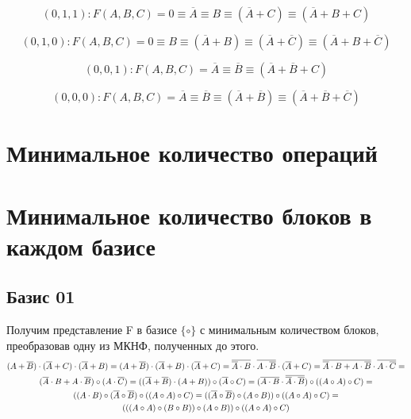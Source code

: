 \documentclass[a4paper,10pt]{article} %
\begin{document}
	\begin{equation}
	(0, 1, 1): F(A, B, C) = 0 \equiv \overline{A} \equiv B \equiv 
	(\overline{A} + C) \equiv (\overline{A} + B + C)
	\end{equation}
	
	\begin{equation}
	(0, 1, 0): F(A, B, C) = 0 \equiv B \equiv (\overline{A} + B) 
	\equiv (\overline{A} + \overline{C}) 
	\equiv (\overline{A} + B + \overline{C})
	\end{equation}
	
	\begin{equation}
	(0, 0, 1): F(A, B, C) = \overline{A} \equiv \overline{B} 
	\equiv (\overline{A} + \overline{B} + C)
	\end{equation}
	
	\begin{equation}
	(0, 0, 0): F(A, B, C) = \overline{A} \equiv \overline{B} 
	\equiv (\overline{A} + \overline{B}) 
	\equiv (\overline{A} + \overline{B} + \overline{C})
	\end{equation}
	
	\section{Минимальное количество операций}
	
	\section{Минимальное количество блоков в каждом базисе}
	
	\subsection{Базис 01}
	Получим представление F в базисе $\{\circ\}$ с минимальным количеством блоков, преобразовав одну из МКНФ, полученных до этого.
	\begin{multline*}
		\noindent
		(A + \overline{B}) \cdot (\overline{A} + C) \cdot (\overline{A} + B) = 
		(A + \overline{B}) \cdot (\overline{A} + B) \cdot (\overline{A} + C) = 
		\overline{\overline{A} \cdot B} \cdot {\overline{A \cdot \overline{B}}} 
		\cdot (\overline{A} + C) = 
		\overline{\overline{A} \cdot B + A \cdot \overline{B}} 
		\cdot \overline{A \cdot \overline{C}} = \\
		(\overline{A} \cdot B + A \cdot \overline{B}) \circ (A \cdot \overline{C}) =
		((\overline{A} + \overline{B}) \cdot (A + B)) \circ (\overline{A} \circ C) =
		(\overline{A \cdot B} \cdot \overline{\overline{A} \cdot \overline{B}})
		\circ ((A \circ A) \circ C) = \\
		((A \cdot B) \circ (\overline{A} \circ \overline{B}) 
		\circ ((A \circ A) \circ C) =
		((\overline{A} \circ \overline{B}) 
		\circ (A \circ B)) \circ ((A \circ A) \circ C) = \\
		(((A \circ A) \circ (B \circ B)) \circ (A \circ B)) 
		\circ ((A \circ A) \circ C) 
	\end{multline*}
\end{document}
